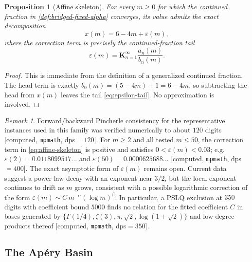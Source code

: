 \documentclass[11pt,a4paper]{article}
\newtheorem{proposition}[theorem]{Proposition}
\theoremstyle{definition}
\theoremstyle{remark}
\newtheorem{remark}[theorem]{Remark}
\begin{document}
\begin{proposition}[Affine skeleton]\label{prop:affine-skeleton}
For every $m \ge 0$ for which the continued fraction in
\autoref{def:bridged-fixed-alpha} converges, its value admits the exact
decomposition
\begin{equation}\label{eq:affine-skeleton}
  x(m) = 6 - 4m + \varepsilon(m),
\end{equation}
where the correction term is precisely the continued-fraction tail
\begin{equation}\label{eq:epsilon-tail}
  \varepsilon(m) = \mathbf{K}_{n=1}^{\infty} \frac{a_n(m)}{b_n(m)}.
\end{equation}
\end{proposition}

\begin{proof}
This is immediate from the definition of a generalized continued fraction.
The head term is exactly $b_0(m)=(5-4m)+1=6-4m$, so subtracting the head from
$x(m)$ leaves the tail \eqref{eq:epsilon-tail}. No approximation is involved.
\end{proof}

\begin{remark}
Forward/backward Pincherle consistency for the representative instances used in
this family was verified numerically to about $120$ digits
[computed, \texttt{mpmath}, dps$=120$]. For $m \ge 2$ and all tested
$m \le 50$, the correction term in \autoref{eq:affine-skeleton} is positive and
satisfies $0 < \varepsilon(m) < 0.03$; e.g.
$\varepsilon(2)=0.0118099517\ldots$ and
$\varepsilon(50)=0.0000625688\ldots$
[computed, \texttt{mpmath}, dps$=400$]. The exact asymptotic form of
$\varepsilon(m)$ remains open. Current data suggest a power-law decay with an
exponent near $3/2$, but the local exponent continues to drift as $m$ grows,
consistent with a possible logarithmic correction of the form
$\varepsilon(m) \sim C\,m^{-\alpha}(\log m)^{\beta}$. In particular, a PSLQ
exclusion at $350$ digits with coefficient bound $5000$ finds no relation for
the fitted coefficient $C$ in bases generated by
$\{\Gamma(1/4),\zeta(3),\pi,\sqrt{2},\log(1+\sqrt{2})\}$ and low-degree
products thereof [computed, \texttt{mpmath}, dps$=350$].
\end{remark}

\subsection{The Ap\'ery Basin}\label{subsec:apery-basin}
\end{document}

